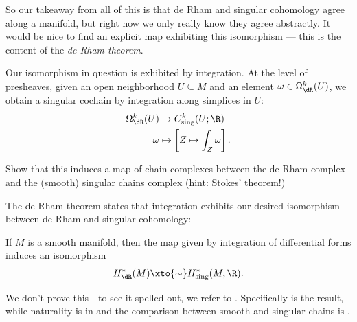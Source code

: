 \documentclass[11pt]{book}
\begin{document}
So our takeaway from all of this is that de Rham and singular cohomology agree along a manifold, but right now we only really know they agree abstractly. It would be nice to find an explicit map exhibiting this isomorphism --- this is the content of the \emph{de Rham theorem}.

Our isomorphism in question is exhibited by integration. At the level of presheaves, given an open neighborhood $U \subseteq M$ and an element $\omega \in \Omega^k_\dR(U)$, we obtain a singular cochain by integration along simplices in $U$:
\begin{align*}
    \Omega_{\dR}^k(U) &\to C^k_{\text{sing}}(U;\R) \\
    \omega &\mapsto \left[ Z \mapsto \int_Z \omega \right].
\end{align*}
\begin{exercise}\label{exer:integration-is-map-of-complexes} 
Show that this induces a map of chain complexes between the de Rham complex and the (smooth) singular chains complex (hint: Stokes' theorem!)
\end{exercise}

The de Rham theorem states that integration exhibits our desired isomorphism between de Rham and singular cohomology:

\begin{theorem} 
\label{thm:de-Rham}
If $M$ is a smooth manifold, then the map given by integration of differential forms induces an isomorphism
\begin{align*}
    H^\ast_\dR(M) \xto{\sim} H^\ast_\text{sing}(M,\R).
\end{align*}
\end{theorem}
We don't prove this - to see it spelled out, we refer to \cite[Chapter~16]{leeIntroductionSmoothManifolds2012}. Specifically \cite[16.12]{leeIntroductionSmoothManifolds2012} is the result, while naturality is in \cite[16.11]{leeIntroductionSmoothManifolds2012} and the comparison between smooth and singular chains is \cite[16.6]{leeIntroductionSmoothManifolds2012}.
\end{document}
